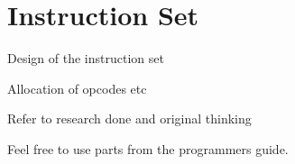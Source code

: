 
\chapter{Instruction Set}

Design of the instruction set

Allocation of opcodes etc

Refer to research done and original thinking

Feel free to use parts from the programmers guide.

